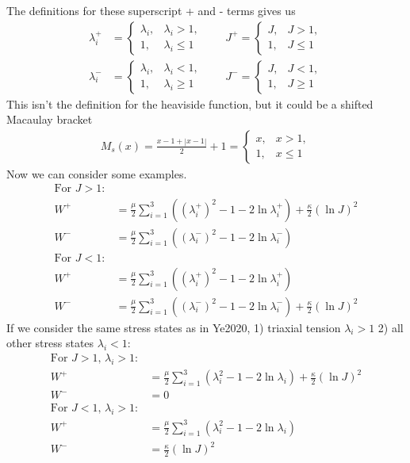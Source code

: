 \documentclass[12pt,3p]{article}
\numberwithin{equation}{section}
\begin{document}
The definitions for these superscript + and - terms gives us  
\begin{align*}
\lambda_i^+ &=
\begin{cases}
	\lambda_i, & \lambda_i > 1, \\
	1, & \lambda_i \leq 1	
\end{cases} \quad \quad 
J^+ =
\begin{cases}
	J, & J > 1, \\
	1, & J \leq 1	
\end{cases} \\
\lambda_i^- &=
\begin{cases}
	\lambda_i, & \lambda_i < 1, \\
	1, & \lambda_i \geq 1	
\end{cases} \quad \quad 
J^- =
\begin{cases}
	J, & J < 1, \\
	1, & J \geq 1	
\end{cases}
\end{align*}
This isn't the definition for the heaviside function, but it could be a shifted Macaulay bracket
\begin{align*}
M_s(x) = \frac{x-1 + |x-1|}{2} + 1 = 
\begin{cases}
	x, & x > 1, \\
	1, & x \leq 1	
\end{cases} 
\end{align*}
Now we can consider some examples. 
\begin{align*}
\text{For } J > 1: &\\
W^+ &= \frac{\mu}{2} \sum_{i = 1}^3 ( (\lambda_i^+)^2 - 1 - 2 \ln \lambda_i^+) + \frac{\kappa}{2} (\ln J)^2 \\
W^- &= \frac{\mu}{2} \sum_{i = 1}^3 ( (\lambda_i^-)^2 - 1 - 2 \ln \lambda_i^-)\\
\text{For } J < 1: &\\
W^+ &= \frac{\mu}{2} \sum_{i = 1}^3 ( (\lambda_i^+)^2 - 1 - 2 \ln \lambda_i^+) \\
W^- &= \frac{\mu}{2} \sum_{i = 1}^3 ( (\lambda_i^-)^2 - 1 - 2 \ln \lambda_i^-) + \frac{\kappa}{2} (\ln J)^2 
\end{align*} 
If we consider the same stress states as in Ye2020, 1) triaxial tension $\lambda_i > 1$ 2) all other stress states $\lambda_i < 1$: 
\begin{align*}
\text{For } J > 1,\, \lambda_i > 1: &\\
W^+ &= \frac{\mu}{2} \sum_{i = 1}^3 (\lambda_i^2 - 1 - 2 \ln \lambda_i) + \frac{\kappa}{2} (\ln J)^2 \\
W^- &= 0 \\
\text{For } J < 1,\, \lambda_i > 1: &\\
W^+ &= \frac{\mu}{2} \sum_{i = 1}^3 (\lambda_i^2 - 1 - 2 \ln \lambda_i) \\
W^- &= \frac{\kappa}{2} (\ln J)^2 
\end{align*}
\end{document}
